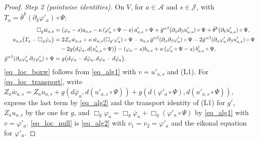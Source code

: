 \documentclass[11pt,a4paper,reqno]{amsart}
\theoremstyle{definition}
\numberwithin{equation}{section}
\newcommand{\cA}{\mathcal{A}}
\newcommand{\cJ}{\mathcal{J}}
\newcommand{\bg}{\bar g}
\newcommand{\bth}{\bar\theta}
\newcommand{\bphi}{\bar\varphi}
\newcommand{\bw}{\bar w}
\begin{document}
\begin{proof}
\emph{Step 2 (pointwise identities).} On $V$, for $a\in\cA$ and $s\in\cJ$, with $T_a=\bth^k(\partial_k\varphi'_a)\circ\Psi$:
\begin{align}
\Box_g\bw_{a,s}&=(\varphi_a-s)a_{a,s}-\kappa\,(\varphi'_a\circ\Psi-s)\,a'_{a,s}\circ\Psi
+\bg^{\alpha\beta}(\partial_\alpha\partial_\beta u'_{a,s})\circ\Psi+\bth^k(\partial_ku'_{a,s})\circ\Psi,\label{eq_loc_boxw}\\
u_{a,s}\bigl(T_a-\Box_g\bphi_a\bigr)&=2Z_a\bw_{a,s}+\kappa\,\bw_{a,s}(\Box_{g'}\varphi'_a)\circ\Psi
-u_{a,s}\,\bg^{\alpha\beta}(\partial_\alpha\partial_\beta\varphi'_a)\circ\Psi
-2\bg^{\alpha\beta}(\partial_\alpha\varphi'_a\,\partial_\beta u'_{a,s})\circ\Psi\notag\\
&\quad-2g\bigl(d\bphi_a,d(u'_{a,s}\circ\Psi)\bigr)-(\varphi_a-s)b_{a,s}+\kappa\,(\varphi'_a\circ\Psi-s)\,b'_{a,s}\circ\Psi,\label{eq_loc_transport}\\
\bg^{\alpha\beta}(\partial_\alpha\varphi'_a\,\partial_\beta\varphi'_a)\circ\Psi&=g\bigl(d\varphi_a-d\bphi_a,d\varphi_a-d\bphi_a\bigr).\label{eq_loc_null}
\end{align}
\eqref{eq_loc_boxw} follows from \eqref{eq_alg1} with $v=u'_{a,s}$ and \textup{(L1)}. For \eqref{eq_loc_transport}, write
$Z_a\bw_{a,s}=Z_au_{a,s}+g(d\bphi_a,d(u'_{a,s}\circ\Psi))+g(d(\varphi'_a\circ\Psi),d(u'_{a,s}\circ\Psi))$, express the last term
by \eqref{eq_alg2} and the transport identity of \textup{(L1)} for $g'$, $Z_au_{a,s}$ by the one for $g$, and
$\Box_g\varphi_a=\Box_g\bphi_a+\Box_g(\varphi'_a\circ\Psi)$ by \eqref{eq_alg1} with $v=\varphi'_a$. \eqref{eq_loc_null} is
\eqref{eq_alg2} with $v_1=v_2=\varphi'_a$ and the eikonal equation for $\varphi'_a$.


\end{proof}
\end{document}
